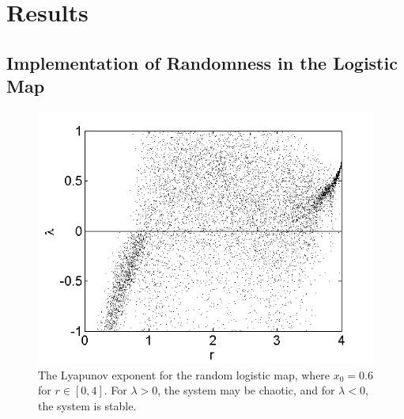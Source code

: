 \chapter{Results}
\section{Implementation of Randomness in the Logistic Map}
\begin{figure}[!h]
\caption[Lyapunov exponent in the random logistic map]{The
  Lyapunov exponent for the random logistic map, where $x_0=0.6$ for $r \in
  [0,4]$. For $\lambda>0$, the system may be chaotic, and for $\lambda
  <0$, the system is stable.}\label{fig:detloglyap1}
	\begin{center}
		\includegraphics[scale=0.65]{figs/r_log_lyap_all.png}
	\end{center}
\end{figure} 

